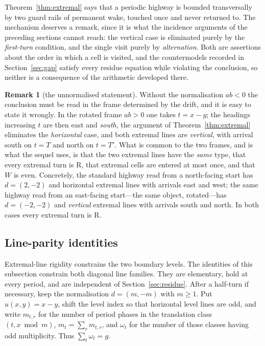 \documentclass[11pt,letterpaper]{article}
\theoremstyle{plain}
\theoremstyle{definition}
\newtheorem{remark}[theorem]{Remark}
\newcommand{\drift}{d}
\newcommand{\growth}{g}
\newcommand{\turnR}{\mathrm{R}}
\begin{document}
\begin{NoHyper}
Theorem~\ref{thm:extremal} says that a periodic highway is bounded transversally by
two guard rails of permanent wake, touched once and never returned to. The mechanism
deserves a remark, since it is what the incidence arguments of the preceding sections
cannot reach: the vertical case is eliminated purely by the \emph{first-turn}
condition, and the single visit purely by \emph{alternation}. Both are assertions
about the order in which a cell is visited, and the countermodels recorded in
Section~\ref{sec:gap} satisfy every residue equation while violating the conclusion,
so neither is a consequence of the arithmetic developed there.

\begin{remark}[the unnormalised statement]\label{rem:frames}
Without the normalisation $ab<0$ the conclusion must be read in the frame determined
by the drift, and it is easy to state it wrongly. In the rotated frame $ab>0$ one
takes $t=x-y$; the headings increasing $t$ are then east and \emph{south}, the
argument of Theorem~\ref{thm:extremal} eliminates the \emph{horizontal} case, and both
extremal lines are \emph{vertical}, with arrival south on $t=T$ and north on $t=T'$.
What is common to the two frames, and is what the sequel uses, is that the two
extremal lines have the \emph{same} type, that every extremal turn is $\turnR$, that
extremal cells are entered at most once, and that $W$ is even. Concretely, the
standard highway read from a north-facing start has $\drift=(2,-2)$ and horizontal
extremal lines with arrivals east and west; the same highway read from an east-facing
start---the same object, rotated---has $\drift=(-2,-2)$ and \emph{vertical} extremal
lines with arrivals south and north. In both cases every extremal turn is $\turnR$.
\end{remark}

\subsection{Line-parity identities}\label{sec:lineparity}

Extremal-line rigidity constrains the two boundary levels. The identities of this
subsection constrain both diagonal line families. They are
elementary, hold at every period, and are independent of
Section~\ref{sec:residue}. After a half-turn if necessary, keep the normalisation
$\drift=(m,-m)$ with $m\ge1$. Put $u(x,y)=x-y$, shift the level index so that
horizontal level lines are odd, and write $m_{t,r}$ for the number of period phases
in the translation class $(t,x\bmod m)$, $m_t=\sum_r m_{t,r}$, and $\omega_t$ for
the number of those classes having odd multiplicity. Thus
$\sum_t\omega_t=\growth$.


\end{NoHyper}
\end{document}
